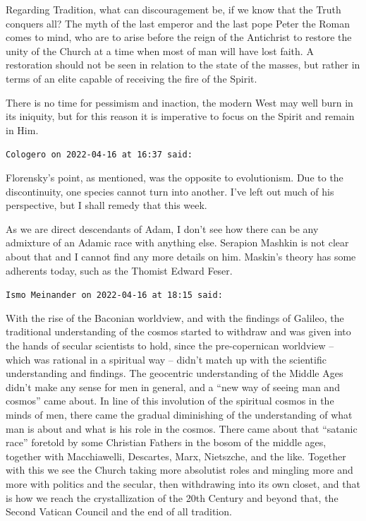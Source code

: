 \begin{footnotesize}
\begin{sffamily}
Regarding Tradition, what can discouragement be, if we know that the Truth conquers all? The myth of the last emperor and the last pope Peter the Roman comes to mind, who are to arise before the reign of the Antichrist to restore the unity of the Church at a time when most of man will have lost faith. A restoration should not be seen in relation to the state of the masses, but rather in terms of an elite capable of receiving the fire of the Spirit.

There is no time for pessimism and inaction, the modern West may well burn in its iniquity, but for this reason it is imperative to focus on the Spirit and remain in Him.

\hfill

\texttt{Cologero on 2022-04-16 at 16:37 said:}

Florensky's point, as mentioned, was the opposite to evolutionism. Due to the discontinuity, one species cannot turn into another. I've left out much of his perspective, but I shall remedy that this week.

As we are direct descendants of Adam, I don't see how there can be any admixture of an Adamic race with anything else. Serapion Mashkin is not clear about that and I cannot find any more details on him. Maskin's theory has some adherents today, such as the Thomist Edward Feser.

\hfill

\texttt{Ismo Meinander on 2022-04-16 at 18:15 said:}

With the rise of the Baconian worldview, and with the findings of Galileo, the traditional understanding of the cosmos started to withdraw and was given into the hands of secular scientists to hold, since the pre-copernican worldview -- which was rational in a spiritual way -- didn't match up with the scientific understanding and findings. The geocentric understanding of the Middle Ages didn't make any sense for men in general, and a ``new way of seeing man and cosmos'' came about. In line of this involution of the spiritual cosmos in the minds of men, there came the gradual diminishing of the understanding of what man is about and what is his role in the cosmos. There came about that ``satanic race'' foretold by some Christian Fathers in the bosom of the middle ages, together with Macchiawelli, Descartes, Marx, Nietszche, and the like. Together with this we see the Church taking more absolutist roles and mingling more and more with politics and the secular, then withdrawing into its own closet, and that is how we reach the crystallization of the 20th Century and beyond that, the Second Vatican Council and the end of all tradition.


\end{sffamily}
\end{footnotesize}
